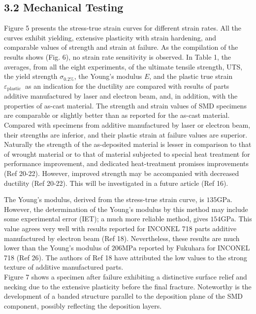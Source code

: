 \documentclass[10pt]{article}
\begin{document}
\subsection*{3.2 Mechanical Testing}
Figure 5 presents the stress-true strain curves for different strain rates. All the curves exhibit yielding, extensive plasticity with strain hardening, and comparable values of strength and strain at failure. As the compilation of the results shows (Fig. 6), no strain rate sensitivity is observed. In Table 1, the averages, from all the eight experiments, of the ultimate tensile strength, UTS, the yield strength $\sigma_{0.2 \%}$, the Young's modulus $E$, and the plastic true strain $\varepsilon_{\text {plastic }}$ as an indication for the ductility are compared with results of parts additive manufactured by laser and electron beam, and, in addition, with the properties of as-cast material. The strength and strain values of SMD specimens are comparable or slightly better than as reported for the as-cast material. Compared with specimens from additive manufactured by laser or electron beam, their strengths are inferior, and their plastic strain at failure values are superior. Naturally the strength of the as-deposited material is lesser in comparison to that of wrought material or to that of material subjected to special heat treatment for performance improvement, and dedicated heat-treatment promises improvements (Ref 20-22). However, improved strength may be accompanied with decreased ductility (Ref 20-22). This will be investigated in a future article (Ref 16).

The Young's modulus, derived from the stress-true strain curve, is $135 \mathrm{GPa}$. However, the determination of the Young's modulus by this method may include some experimental error (IET); a much more reliable method, gives $154 \mathrm{GPa}$. This value agrees very well with results reported for INCONEL 718 parts additive manufactured by electron beam (Ref 18). Nevertheless, these results are much lower than the Young's modulus of $206 \mathrm{MPa}$ reported by Fukuhara for INCONEL 718 (Ref 26). The authors of Ref 18 have attributed the low values to the strong texture of additive manufactured parts.\\
Figure 7 shows a specimen after failure exhibiting a distinctive surface relief and necking due to the extensive plasticity before the final fracture. Noteworthy is the development of a banded structure parallel to the deposition plane of the SMD component, possibly reflecting the deposition layers.
\end{document}
